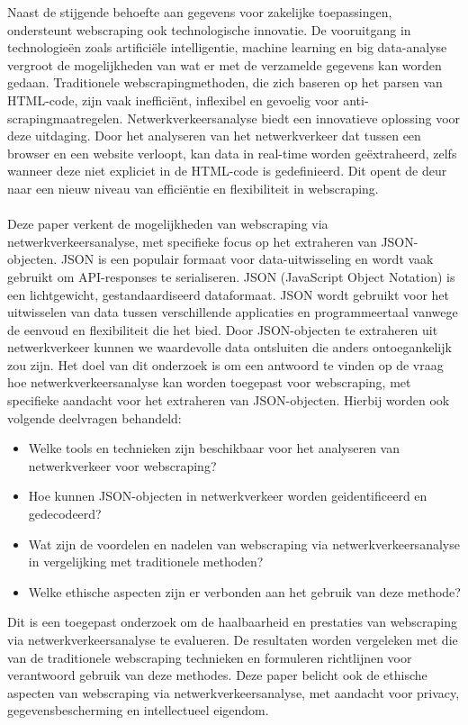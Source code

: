 Naast de stijgende behoefte aan gegevens voor zakelijke toepassingen, ondersteunt webscraping ook technologische innovatie. 
De vooruitgang in technologieën zoals artificiële intelligentie, machine learning en big data-analyse vergroot de mogelijkheden
van wat er met de verzamelde gegevens kan worden gedaan.
Traditionele webscrapingmethoden, die zich baseren op het parsen van HTML-code, zijn vaak inefficiënt, inflexibel en gevoelig voor anti-scrapingmaatregelen.
Netwerkverkeersanalyse biedt een innovatieve oplossing voor deze uitdaging. Door het analyseren van het netwerkverkeer dat tussen een browser en een website verloopt, 
kan data in real-time worden geëxtraheerd, zelfs wanneer deze niet expliciet in de HTML-code is gedefinieerd. Dit opent de deur naar een nieuw niveau van efficiëntie en 
flexibiliteit in webscraping.
\\
\\
Deze paper verkent de mogelijkheden van webscraping via netwerkverkeersanalyse, met specifieke focus op het extraheren van JSON-objecten. JSON is een populair formaat voor 
data-uitwisseling en wordt vaak gebruikt om API-responses te serialiseren. JSON (JavaScript Object Notation) is een lichtgewicht, gestandaardiseerd dataformaat.
JSON wordt gebruikt voor het uitwisselen van data tussen verschillende applicaties en programmeertaal vanwege de eenvoud en flexibiliteit die het bied.
Door JSON-objecten te extraheren uit netwerkverkeer kunnen we waardevolle data ontsluiten 
die anders ontoegankelijk zou zijn. Het doel van dit onderzoek is om een antwoord te vinden op de vraag hoe netwerkverkeersanalyse kan worden toegepast voor webscraping,
met specifieke aandacht voor het extraheren van JSON-objecten. Hierbij worden ook volgende deelvragen behandeld:
\begin{itemize}
  \item Welke tools en technieken zijn beschikbaar voor het analyseren van netwerkverkeer voor webscraping?
  \item Hoe kunnen JSON-objecten in netwerkverkeer worden geidentificeerd en gedecodeerd?
  \item Wat zijn de voordelen en nadelen van webscraping via netwerkverkeersanalyse in vergelijking met traditionele methoden?
  \item Welke ethische aspecten zijn er verbonden aan het gebruik van deze methode?
\end{itemize}
Dit is een toegepast onderzoek om de haalbaarheid en prestaties van webscraping via netwerkverkeersanalyse te evalueren. De resultaten worden vergeleken met die van de traditionele
webscraping technieken en formuleren richtlijnen voor verantwoord gebruik van deze methodes. Deze paper belicht ook de ethische aspecten van webscraping via netwerkverkeersanalyse,
met aandacht voor privacy, gegevensbescherming en intellectueel eigendom.

